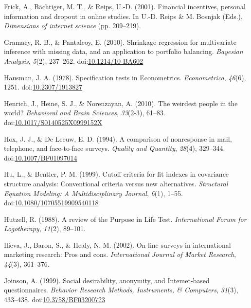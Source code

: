 \documentclass[english,man, mask]{apa6}
\theoremstyle{definition}
\theoremstyle{definition}
\theoremstyle{definition}
\theoremstyle{remark}
\begin{document}
\hypertarget{ref-Frick2001}{}
Frick, A., Bächtiger, M. T., \& Reips, U.-D. (2001). Financial
incentives, personal information and dropout in online studies. In U.-D.
Reips \& M. Bosnjak (Eds.), \emph{Dimensions of internet science} (pp.
209--219).

\hypertarget{ref-Gramacy2010}{}
Gramacy, R. B., \& Pantaleoy, E. (2010). Shrinkage regression for
multivariate inference with missing data, and an application to
portfolio balancing. \emph{Bayesian Analysis}, \emph{5}(2), 237--262.
doi:\href{https://doi.org/10.1214/10-BA602}{10.1214/10-BA602}

\hypertarget{ref-Hausman1978}{}
Hausman, J. A. (1978). Specification tests in Econometrics.
\emph{Econometrica}, \emph{46}(6), 1251.
doi:\href{https://doi.org/10.2307/1913827}{10.2307/1913827}

\hypertarget{ref-Henrich2010}{}
Henrich, J., Heine, S. J., \& Norenzayan, A. (2010). The weirdest people
in the world? \emph{Behavioral and Brain Sciences}, \emph{33}(2-3),
61--83.
doi:\href{https://doi.org/10.1017/S0140525X0999152X}{10.1017/S0140525X0999152X}

\hypertarget{ref-Hox1994}{}
Hox, J. J., \& De Leeuw, E. D. (1994). A comparison of nonresponse in
mail, telephone, and face-to-face surveys. \emph{Quality and Quantity},
\emph{28}(4), 329--344.
doi:\href{https://doi.org/10.1007/BF01097014}{10.1007/BF01097014}

\hypertarget{ref-Hu1999}{}
Hu, L., \& Bentler, P. M. (1999). Cutoff criteria for fit indexes in
covariance structure analysis: Conventional criteria versus new
alternatives. \emph{Structural Equation Modeling: A Multidisciplinary
Journal}, \emph{6}(1), 1--55.
doi:\href{https://doi.org/10.1080/10705519909540118}{10.1080/10705519909540118}

\hypertarget{ref-Hutzell1988}{}
Hutzell, R. (1988). A review of the Purpose in Life Test.
\emph{International Forum for Logotherapy}, \emph{11}(2), 89--101.

\hypertarget{ref-Ilieva2001}{}
Ilieva, J., Baron, S., \& Healy, N. M. (2002). On-line surveys in
international marketing research: Pros and cons. \emph{International
Journal of Market Research}, \emph{44}(3), 361--376.

\hypertarget{ref-Joinson1999}{}
Joinson, A. (1999). Social desirability, anonymity, and Intemet-based
questionnaires. \emph{Behavior Research Methods, Instruments, \&
Computers}, \emph{31}(3), 433--438.
doi:\href{https://doi.org/10.3758/BF03200723}{10.3758/BF03200723}
\end{document}
